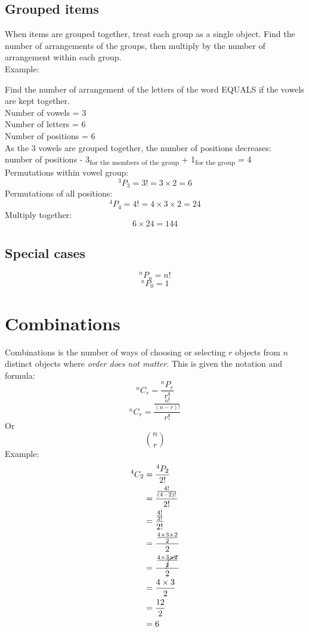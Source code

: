 \documentclass{book}
\begin{document}
\section{Grouped items}
When items are grouped together, treat each group as a single object.  Find the number of arrangements of the groups, then multiply by the number of arrangement within each group.\\
Example:\\
\begin{center}
	Find the number of arrangement of the letters of the word EQUALS if the vowels are kept together.\\
	Number of vowels = 3\\
	Number of letters = 6\\
	Number of positions = 6\\
	As the 3 vowels are grouped together, the number of positions decreases:\\ number of positions - 3\textsubscript{for the members of the group} + 1\textsubscript{for the group} = 4\\
	Permutations within vowel group:
	\[^3P_3 = 3! = 3 \times 2 = 6\]
	Permutations of all positions:
	\[^4P_4 = 4! = 4 \times 3 \times 2 = 24\]
	Multiply together:
	\[6 \times 24 = 144\]
\end{center}

\section{Special cases}
\[^nP_n = n!\]
\[^nP_0 = 1\]

\chapter{Combinations}
Combinations is the number of ways of choosing or selecting $r$ objects from $n$ distinct objects where \emph{order does not matter}.  This is given the notation and formula:
\[^nC_r = \frac{^nP_r}{r!}\]
\[^nC_r = \frac{\frac{n!}{(n-r)!}}{r!}\]
Or
\[
	\binom{n}{r}
\]
Example:\\
\begin{align*}
	^4C_2 & = \frac{^4P_2}{2!}                                          \\
	      & = \frac{\frac{4!}{(4 - 2)!}}{2!}                            \\
	      & = \frac{\frac{4!}{2!}}{2!}                                  \\
	      & = \frac{\frac{4 \times 3 \times 2}{2}}{2}                   \\
	      & = \frac{\frac{4 \times 3 \cancel{\times 2}}{\cancel{2}}}{2} \\
	      & = \frac{4 \times 3}{2}                                      \\
	      & = \frac{12}{2}                                              \\
	      & = 6                                                         \\
\end{align*}
\end{document}
